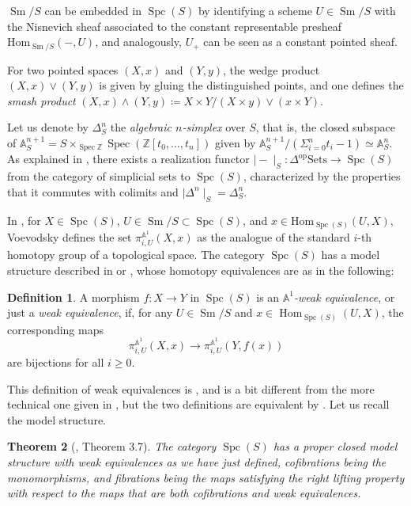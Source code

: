\documentclass[10pt]{amsart}
\theoremstyle{definition}
\newtheorem{defn}{Definition}[section]
\theoremstyle{plain}
\newtheorem{thm}[defn]{Theorem}
\numberwithin{equation}{section}
\newcommand{\0}{\emptyset}
\newcommand{\A}{{\mathbb A}}
\newcommand{\Z}{{\mathbb Z}}
\newcommand{\Spec}{{\operatorname{Spec}}}
\newcommand{\Spc}{{\operatorname{Spc}}}
\newcommand{\Sm}{{\operatorname{Sm}}}
\newcommand{\Hom}{{\operatorname{Hom}}}
\begin{document}
$\Sm/S$ can be embedded in $\Spc(S)$ by identifying a scheme $U \in \Sm/S$ with the Nisnevich sheaf associated to the constant representable presheaf $\text{Hom}_{\Sm/S}(-,U)$, and analogously, $U_+$ can be seen as a constant pointed sheaf.

For two pointed spaces $(X,x)$ and $(Y,y)$, the wedge product $(X,x) \vee (Y,y)$ is given by gluing the distinguished points, and one defines the \emph{smash product} $(X,x)\wedge (Y,y)\coloneqq X \times Y /(X \times y) \vee (x \times Y)$.

Let us denote by $\Delta_S^n$ the \emph{algebraic $n$-simplex} over $S$, that is, the closed subspace of $\A^{n+1}_S=S \times_{\Spec \Z}\Spec(\Z[t_0,\ldots,t_n])$ given by $\A_S^{n+1}/(\Sigma_{i=0}^nt_i-1) \simeq \A_S^n$. As explained in \cite[Section 3, p. 584]{voe:homotopy_theory}, there exists a realization functor $\mid - \mid_S:\Delta^{\text{op}}\text{Sets} \to \Spc(S)$ from the category of simplicial sets to $\Spc(S)$, characterized by the properties that it commutes with colimits and $\mid \Delta^n \mid_S=\Delta_S^n$. 

In \cite[Section 3, p. 585]{voe:homotopy_theory}, for $X \in \Spc(S)$, $U \in \Sm/S \subset \Spc(S)$, and $x \in \text{Hom}_{\Spc(S)}(U,X)$, Voevodsky defines the set $\pi^{\A^1}_{i,U}(X,x)$ as the analogue of the standard $i$-th homotopy group of a topological space. The category $\Spc(S)$ has a model structure described in \cite[Section 2]{morvoe:homotopytheory} or \cite[Section 3]{voe:homotopy_theory}, whose homotopy equivalences are as in the following:
\begin{defn}
    A morphism $f: X \to Y$ in $\Spc(S)$ is an \emph{$\A^1$-weak equivalence}, or just a \emph{weak equivalence}, if, for any $U \in \Sm/S$ and $x \in \Hom_{\Spc(S)}(U,X)$, the corresponding maps
    $$\pi^{\A^1}_{i,U}(X,x) \to \pi^{\A^1}_{i,U}(Y,f(x))$$
    are bijections for all $i \ge 0$.
\end{defn}

This definition of weak equivalences is \cite[Definition 3.4]{voe:homotopy_theory}, and is a bit different from the more technical one given in \cite[\S2 Definition 1.2 (1)]{morvoe:homotopytheory}, but the two definitions are equivalent by \cite[Theorem 3.6]{voe:homotopy_theory}. Let us recall the model structure.

\begin{thm}[\cite{voe:homotopy_theory}, Theorem 3.7]
\label{thm:model-spaces}
    The category $\Spc(S)$ has a proper closed model structure with weak equivalences as we have just defined, cofibrations being the monomorphisms, and fibrations being the maps satisfying the right lifting property with respect to the maps that are both cofibrations and weak equivalences.
\end{thm}
\end{document}
